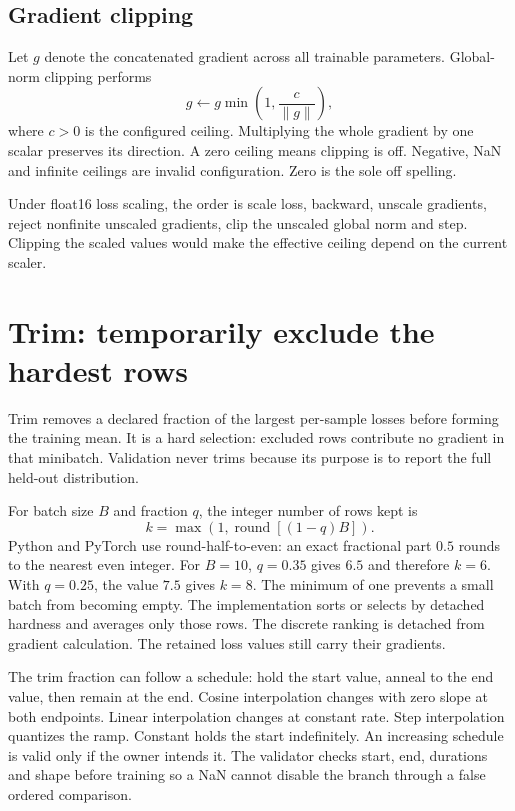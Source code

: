 \documentclass[10pt,aps,prd,twocolumn,nofootinbib]{revtex4-2}
\begin{document}
\subsection{Gradient clipping}

Let \(g\) denote the concatenated gradient across all trainable parameters.
Global-norm clipping performs
\begin{equation*}
 g\leftarrow g\min\left(1,\frac{c}{\lVert g\rVert}\right),
\end{equation*}
where \(c>0\) is the configured ceiling.  Multiplying the whole gradient by
one scalar preserves its direction.  A zero ceiling means clipping is off.
Negative, NaN and infinite ceilings are invalid configuration.  Zero is the
sole off spelling.

Under float16 loss scaling, the order is scale loss, backward, unscale
gradients, reject nonfinite unscaled gradients, clip the unscaled global norm
and step.  Clipping the scaled values would make the effective ceiling depend
on the current scaler.

\section{Trim: temporarily exclude the hardest rows}
\label{sec:trim}

Trim removes a declared fraction of the largest per-sample losses before
forming the training mean.  It is a hard selection: excluded rows contribute
no gradient in that minibatch.  Validation never trims because its purpose is
to report the full held-out distribution.

For batch size \(B\) and fraction \(q\), the integer number of rows kept is
\begin{equation*}
 k=\max\!\left(1,\operatorname{round}[(1-q)B]\right).
\end{equation*}
Python and PyTorch use round-half-to-even: an exact fractional part $0.5$
rounds to the nearest even integer.  For $B=10$, $q=0.35$ gives $6.5$ and
therefore $k=6$.  With $q=0.25$, the value $7.5$ gives $k=8$.  The
minimum of one prevents a small batch from becoming empty.  The implementation
sorts or selects by detached hardness and averages only those rows.  The
discrete ranking is detached from gradient calculation.  The retained loss
values still carry their gradients.

The trim fraction can follow a schedule: hold the start value, anneal to the
end value, then remain at the end.  Cosine interpolation changes with zero
slope at both endpoints.  Linear interpolation changes at constant rate.  Step
interpolation quantizes the ramp.  Constant holds the start indefinitely.  An
increasing schedule is valid only if the owner intends it.  The validator
checks start, end, durations and shape before training so a NaN cannot disable
the branch through a false ordered comparison.
\end{document}
